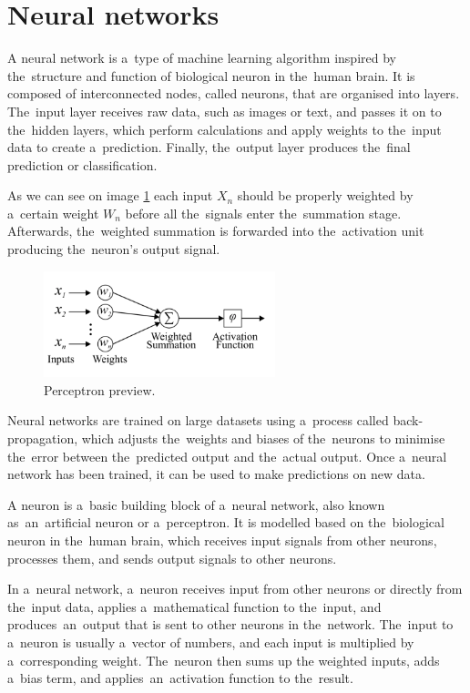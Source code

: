     \section{Neural networks} \label{sec:nn}
    A neural network is a~type of machine learning algorithm inspired by the~structure and function of biological neuron in the~human brain. It is composed of interconnected nodes, called neurons, that are organised into layers. The~input layer receives raw data, such as images or text, and passes it on to the~hidden layers, which perform calculations and apply weights to the~input data to create a~prediction. Finally, the~output layer produces the~final prediction or classification.
    
    As we can see on image \ref{fig:perceptron} each input $X_n$ should be properly weighted by a~certain weight $W_n$ before all the~signals enter the~summation stage. Afterwards, the~weighted summation is forwarded into the~activation unit producing the~neuron’s output signal.
    \begin{center}
        \begin{figure}[]
            \centering
            \includegraphics[width=0.6\textwidth]{figures/nn}
            \caption{Perceptron preview. \cite{Mourgias-Alexandris:19}}
            \label{fig:perceptron}
        \end{figure}
    \end{center}
    Neural networks are trained on large datasets using a~process called back-propagation, which adjusts the~weights and biases of the~neurons to minimise the~error between the~predicted output and the~actual output. Once a~neural network has been trained, it can be used to make predictions on new data.
    
    A neuron is a~basic building block of a~neural network, also known as~an~artificial neuron or a~perceptron.
It is modelled based on the~biological neuron in the~human brain, which receives input signals from other neurons,
processes them, and sends output signals to other neurons.

    In a~neural network, a~neuron receives input from other neurons or directly from the~input data, applies a~mathematical function to the~input, and produces~an~output that is sent to other neurons in the~network. The~input to a~neuron is usually a~vector of numbers, and each input is multiplied by a~corresponding weight. The~neuron then sums up the weighted inputs, adds a~bias term, and applies~an~activation function to the~result.


